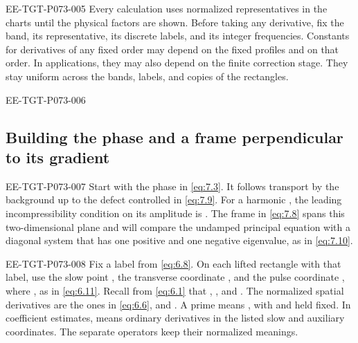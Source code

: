 \begin{EESegment}{EE-TGT-P073-005}
Every calculation uses normalized representatives in the charts until the physical factors are shown. Before taking any derivative, fix the band, its representative, its discrete labels, and its integer frequencies. Constants for derivatives of any fixed order may depend on the fixed profiles and on that order. In applications, they may also depend on the finite correction stage. They stay uniform across the bands, labels, and copies of the rectangles.
\end{EESegment}

\begin{EESegment}{EE-TGT-P073-006}
\subsection{Building the phase and a frame perpendicular to its gradient}\label{sec:7.1}
\end{EESegment}

\begin{EESegment}{EE-TGT-P073-007}
Start with the phase  in \eqref{eq:7.3}. It follows transport by the background up to the defect controlled in \eqref{eq:7.9}. For a harmonic , the leading incompressibility condition on its amplitude  is . The frame  in \eqref{eq:7.8} spans this two-dimensional plane and will compare the undamped principal equation with a diagonal system that has one positive and one negative eigenvalue, as in \eqref{eq:7.10}.
\end{EESegment}

\begin{EESegment}{EE-TGT-P073-008}
Fix a label  from \eqref{eq:6.8}. On each lifted rectangle with that label, use the slow point , the transverse coordinate , and the pulse coordinate , where , as in \eqref{eq:6.11}. Recall from \eqref{eq:6.1} that , , and . The normalized spatial derivatives are the ones in \eqref{eq:6.6}, and . A prime means , with  and  held fixed. In coefficient estimates,  means ordinary derivatives in the listed slow and auxiliary coordinates. The separate operators  keep their normalized meanings.
\end{EESegment}


